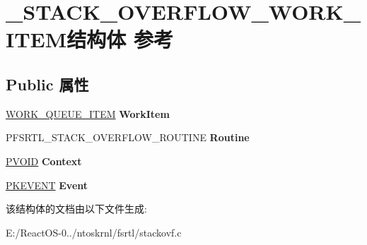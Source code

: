 \hypertarget{struct___s_t_a_c_k___o_v_e_r_f_l_o_w___w_o_r_k___i_t_e_m}{}\section{\+\_\+\+S\+T\+A\+C\+K\+\_\+\+O\+V\+E\+R\+F\+L\+O\+W\+\_\+\+W\+O\+R\+K\+\_\+\+I\+T\+E\+M结构体 参考}
\label{struct___s_t_a_c_k___o_v_e_r_f_l_o_w___w_o_r_k___i_t_e_m}
\subsection*{Public 属性}
\begin{DoxyCompactItemize}
\item 
\mbox{\label{struct___s_t_a_c_k___o_v_e_r_f_l_o_w___w_o_r_k___i_t_e_m_a71e55e67d21a17b348eec53b7b2fd00e}} 
\hyperlink{struct___w_o_r_k___q_u_e_u_e___i_t_e_m}{W\+O\+R\+K\+\_\+\+Q\+U\+E\+U\+E\+\_\+\+I\+T\+EM} {\bfseries Work\+Item}
\item 
\mbox{\label{struct___s_t_a_c_k___o_v_e_r_f_l_o_w___w_o_r_k___i_t_e_m_aa94ffd6225f14c516b21caf9f3a997bc}} 
P\+F\+S\+R\+T\+L\+\_\+\+S\+T\+A\+C\+K\+\_\+\+O\+V\+E\+R\+F\+L\+O\+W\+\_\+\+R\+O\+U\+T\+I\+NE {\bfseries Routine}
\item 
\mbox{\label{struct___s_t_a_c_k___o_v_e_r_f_l_o_w___w_o_r_k___i_t_e_m_af3e2c448156d8fbcd54db7f9f623b4f3}} 
\hyperlink{interfacevoid}{P\+V\+O\+ID} {\bfseries Context}
\item 
\mbox{\label{struct___s_t_a_c_k___o_v_e_r_f_l_o_w___w_o_r_k___i_t_e_m_ac72aa2aaf3136e6db0c96b6ae1233f19}} 
\hyperlink{struct___k_e_v_e_n_t}{P\+K\+E\+V\+E\+NT} {\bfseries Event}
\end{DoxyCompactItemize}


该结构体的文档由以下文件生成\+:\begin{DoxyCompactItemize}
\item 
E\+:/\+React\+O\+S-\/0../ntoskrnl/fsrtl/stackovf.\+c\end{DoxyCompactItemize}
